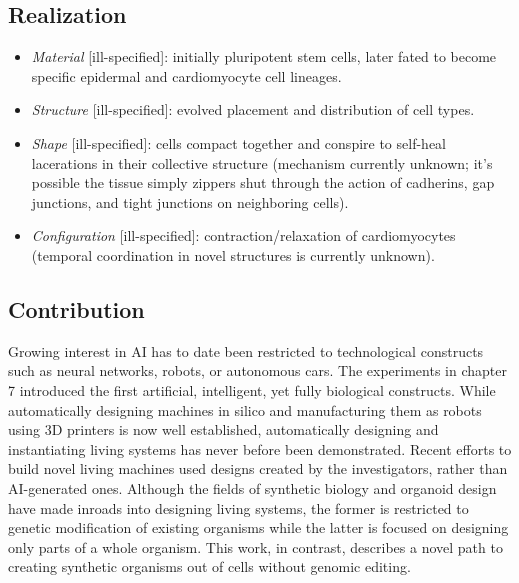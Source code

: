 \subsection{Realization}

\begin{itemize}
    \item \textit{Material} [ill-specified]: initially pluripotent stem cells, later fated to become specific epidermal and cardiomyocyte cell lineages.
    \item \textit{Structure} [ill-specified]: evolved placement and distribution of cell types.
    \item \textit{Shape} [ill-specified]: cells compact together and conspire to self-heal lacerations in their collective structure (mechanism currently unknown; it's possible the tissue simply zippers shut through the action of cadherins, gap junctions, and tight junctions on neighboring cells).
    
    \item \textit{Configuration} [ill-specified]: contraction/relaxation of cardiomyocytes (temporal coordination in novel structures is currently unknown).
\end{itemize}


\subsection{Contribution}

Growing interest in AI has to date been restricted to technological constructs such as neural networks, robots, or autonomous cars. 
The experiments in chapter 7
introduced the first artificial, intelligent, yet fully biological constructs. 
While automatically designing machines in silico and manufacturing them as robots using 3D printers is now well established, automatically designing and instantiating living systems has never before been demonstrated. 
Recent efforts to build novel living machines \cite{herr2004swimming,xi2005self,feinberg2007muscular,cvetkovic2014three,raman2016optogenetic,nawroth2012tissue,park2016phototactic,ricotti2017biohybrid} used designs created by the investigators, rather than AI-generated ones.
Although the fields of synthetic biology and organoid design have made inroads into designing living systems, the former is restricted to genetic modification of existing organisms while the latter is focused on designing only parts of a whole organism.
This work, in contrast, describes a novel path to creating synthetic organisms out of cells without genomic editing.

